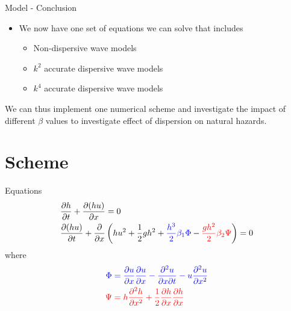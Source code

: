 \documentclass[pdf]{beamer}
\begin{document}
\begin{frame}[plain]{}
\end{frame}



\begin{frame}{Model - Conclusion}
\begin{itemize}
	\item We now have one set of equations we can solve that includes
	\begin{itemize}
		\item Non-dispersive wave models
		\item $k^2$ accurate dispersive wave models
		\item $k^4$ accurate dispersive wave models
	\end{itemize}
\end{itemize}
We can thus implement one numerical scheme and investigate the impact of different $\beta$ values to investigate effect of dispersion on natural hazards. 
\end{frame}


\section{Scheme}
\begin{frame}{Equations}
\begin{align*}
&\dfrac{\partial h}{\partial t} + \dfrac{\partial (hu)}{\partial x} = 0\\
&\dfrac{\partial (hu)}{\partial t} + \dfrac{\partial }{\partial x} \left( hu^2 + \frac{1}{2}gh^2  +  {\color{blue} \frac{h^3}{2}\beta_1 \Phi } -   {\color{red} \frac{gh^2}{2} \beta_2 \Psi}  \right)= 0 \\
\end{align*}
where
\begin{align*}
\color{blue} \Phi  & \color{blue}= \frac{\partial u}{\partial x}\frac{\partial u}{\partial x} - \frac{\partial^2 u}{\partial x \partial t} - u\frac{\partial^2 u}{\partial x^2} \\
\color{red} \Psi & \color{red}= h \frac{\partial^2 h}{\partial x^2} + \frac{1}{2} \frac{\partial h}{\partial x}\frac{\partial h}{\partial x} 
\end{align*}
\end{frame}
\end{document}
